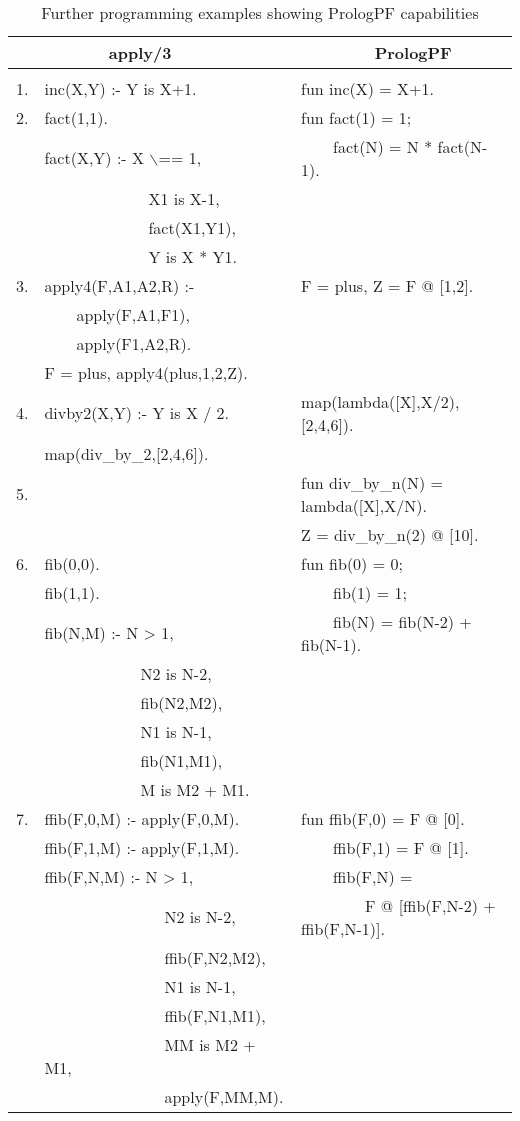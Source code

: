 \begin{table}[htb]
{\footnotesize
\tt
\begin{tabular}{| l | l | l |}
\hline
   &~~~~~~~apply/3                &~~~~~~~~PrologPF \\
\hline
& & \\
1. &inc(X,Y) :- Y is X+1.            &fun inc(X) = X+1.\\
2. &fact(1,1).                       &fun fact(1) = 1;\\
   &fact(X,Y) :- X $\backslash$== 1, &~~~~fact(N) = N * fact(N-1).\\
   &~~~~~~~~~~~~~X1 is X-1,       &\\
   &~~~~~~~~~~~~~fact(X1,Y1),     &\\
   &~~~~~~~~~~~~~Y is X * Y1.     &\\
3. &apply4(F,A1,A2,R) :-          &F = plus, Z = F @ [1,2].\\
   &~~~~apply(F,A1,F1),           &\\
   &~~~~apply(F1,A2,R).           &\\
   &F = plus, apply4(plus,1,2,Z). &\\
4. &divby2(X,Y) :- Y is X / 2.    &map(lambda([X],X/2),[2,4,6]).\\
   &map(div\_{}by\_{}2,[2,4,6]).  &\\
5. &                              &fun div\_{}by\_{}n(N) = lambda([X],X/N).\\
   &                              &Z = div\_{}by\_{}n(2) @ [10].\\
6. &fib(0,0).                     &fun fib(0) = 0;\\
   &fib(1,1).                     &~~~~fib(1) = 1;\\
   &fib(N,M) :- N > 1,            &~~~~fib(N) = fib(N-2) + fib(N-1).\\
   &~~~~~~~~~~~~N2 is N-2,        &\\
   &~~~~~~~~~~~~fib(N2,M2),       &\\
   &~~~~~~~~~~~~N1 is N-1,        &\\
   &~~~~~~~~~~~~fib(N1,M1),       &\\
   &~~~~~~~~~~~~M is M2 + M1.     &\\
7. &ffib(F,0,M) :- apply(F,0,M).  &fun ffib(F,0) = F @ [0].\\
   &ffib(F,1,M) :- apply(F,1,M).  &~~~~ffib(F,1) = F @ [1].\\
   &ffib(F,N,M) :- N > 1,         &~~~~ffib(F,N) =\\
   &~~~~~~~~~~~~~~~N2 is N-2,     &~~~~~~~~F @ [ffib(F,N-2) + ffib(F,N-1)].\\
   &~~~~~~~~~~~~~~~ffib(F,N2,M2), &\\
   &~~~~~~~~~~~~~~~N1 is N-1,     &\\
   &~~~~~~~~~~~~~~~ffib(F,N1,M1), &\\
   &~~~~~~~~~~~~~~~MM is M2 + M1, &\\
   &~~~~~~~~~~~~~~~apply(F,MM,M). &\\
\hline
\end{tabular}
}
\label{prologpf_syntax_advantages}
\caption{Further programming examples showing PrologPF capabilities}
\end{table}

